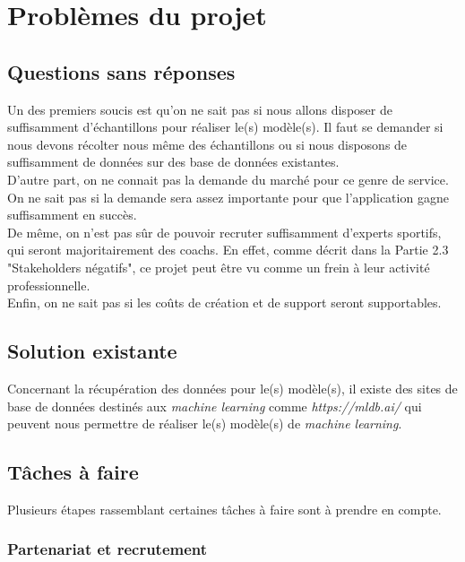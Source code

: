 
\chapter{Problèmes du projet}

\section{Questions sans réponses}

Un des premiers soucis est qu'on ne sait pas si nous allons disposer de suffisamment d'échantillons pour réaliser le(s) modèle(s). Il faut se demander si nous devons récolter nous même des échantillons ou si nous disposons de suffisamment de données sur des base de données existantes.\\

D'autre part, on ne connait pas la demande du marché pour ce genre de service. On ne sait pas si la demande sera assez importante pour que l'application gagne suffisamment en succès.\\

De même, on n'est pas sûr de pouvoir recruter suffisamment d'experts sportifs, qui seront majoritairement des coachs. En effet, comme décrit dans la Partie 2.3 "Stakeholders négatifs", ce projet peut être vu comme un frein à leur activité professionnelle.\\ 

Enfin, on ne sait pas si les coûts de création et de support seront supportables.  

\section{Solution existante}

Concernant la récupération des données pour le(s) modèle(s), il existe des sites de base de données destinés aux \textit{machine learning} comme \textit{https://mldb.ai/} qui peuvent nous permettre de réaliser le(s) modèle(s) de \textit{machine learning}.

\section{Tâches à faire}

Plusieurs étapes rassemblant certaines tâches à faire sont à prendre en compte. 

\subsection*{Partenariat et recrutement}

